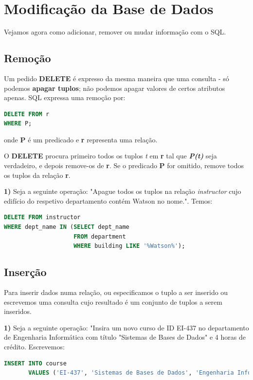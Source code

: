 \documentclass[oneside]{book}
\theoremstyle{definition}
\begin{document}
\section{Modificação da Base de Dados}
Vejamos agora como adicionar, remover ou mudar informação com o SQL.

\subsection{Remoção}
Um pedido \textbf{DELETE} é expresso da mesma maneira que uma consulta - só podemos \textbf{apagar tuplos}; não podemos apagar valores de certos atributos apenas. SQL expressa uma remoção por:

\begin{lstlisting}[language=SQL, morekeywords={REFERENCES, REFRESH, MATERIALIZED, CONCURRENTLY}, framesep=8pt, xleftmargin=40pt, framexleftmargin=40pt, frame=tb, framerule=0pt]
DELETE FROM r
WHERE P;
\end{lstlisting}
onde \textbf{P} é um predicado e \textbf{r} representa uma relação.

O \textbf{DELETE} procura primeiro todos os tuplos \textit{t} em \textbf{r} tal que \textbf{\textit{P(t)}} seja verdadeiro, e depois remove-os de \textbf{r}. Se o predicado \textbf{P} for omitido, remove todos os tuplos da relação \textbf{r}.

\textbf{1)} Seja a seguinte operação: "Apague todos os tuplos na relação \textit{instructor} cujo edifício do respetivo departamento contém Watson no nome.". Temos:
\begin{lstlisting}[language=SQL, morekeywords={REFERENCES, REFRESH, MATERIALIZED, CONCURRENTLY}, framesep=8pt, xleftmargin=40pt, framexleftmargin=40pt, frame=tb, framerule=0pt]
DELETE FROM instructor
WHERE dept_name IN (SELECT dept_name
                    FROM department
                    WHERE building LIKE '%Watson%');
\end{lstlisting}

\subsection{Inserção}
Para inserir dados numa relação, ou especificamos o tuplo a ser inserido ou escrevemos uma consulta cujo resultado é um conjunto de tuplos a serem inseridos.

\textbf{1)} Seja a seguinte operação: "Insira um novo curso de ID EI-437 no departamento de Engenharia Informática com título "Sistemas de Bases de Dados" e 4 horas de crédito. Escrevemos:
\begin{lstlisting}[language=SQL, morekeywords={REFERENCES, REFRESH, MATERIALIZED, CONCURRENTLY}, framesep=8pt, xleftmargin=40pt, framexleftmargin=40pt, frame=tb, framerule=0pt]
INSERT INTO course
       VALUES ('EI-437', 'Sistemas de Bases de Dados', 'Engenharia Informatica', 4);
\end{lstlisting}
\end{document}
